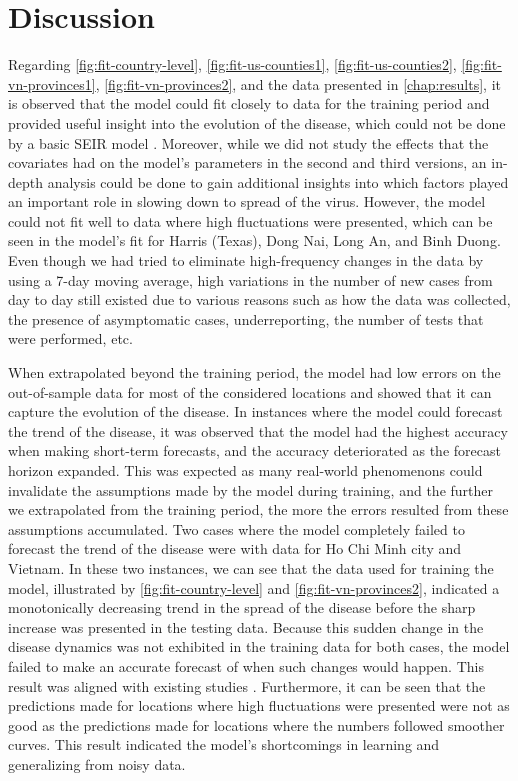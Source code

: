\chapter{Discussion}
\label{chap:discussion}

Regarding \autoref{fig:fit-country-level}, \autoref{fig:fit-us-counties1}, \autoref{fig:fit-us-counties2}, \autoref{fig:fit-vn-provinces1}, \autoref{fig:fit-vn-provinces2}, and the data presented in \autoref{chap:results}, it is observed that the model could fit closely to data for the training period and provided useful insight into the evolution of the disease, which could not be done by a basic \gls{SEIR} model \cite{dandekarMachineLearningAidedGlobal2020a}.
Moreover, while we did not study the effects that the covariates had on the model's parameters in the second and third versions, an in-depth analysis could be done to gain additional insights into which factors played an important role in slowing down to spread of the virus.
However, the model could not fit well to data where high fluctuations were presented, which can be seen in the model's fit for Harris (Texas), Dong Nai, Long An, and Binh Duong.
Even though we had tried to eliminate high-frequency changes in the data by using a 7-day moving average, high variations in the number of new cases from day to day still existed due to various reasons such as how the data was collected, the presence of asymptomatic cases, underreporting, the number of tests that were performed, etc.

When extrapolated beyond the training period, the model had low errors on the out-of-sample data for most of the considered locations and showed that it can capture the evolution of the disease.
In instances where the model could forecast the trend of the disease, it was observed that the model had the highest accuracy when making short-term forecasts, and the accuracy deteriorated as the forecast horizon expanded.
This was expected as many real-world phenomenons could invalidate the assumptions made by the model during training, and the further we extrapolated from the training period, the more the errors resulted from these assumptions accumulated.
Two cases where the model completely failed to forecast the trend of the disease were with data for Ho Chi Minh city and Vietnam.
In these two instances, we can see that the data used for training the model, illustrated by \autoref{fig:fit-country-level} and \autoref{fig:fit-vn-provinces2}, indicated a monotonically decreasing trend in the spread of the disease before the sharp increase was presented in the testing data.
Because this sudden change in the disease dynamics was not exhibited in the training data for both cases, the model failed to make an accurate forecast of when such changes would happen.
This result was aligned with existing studies \cite{arikInterpretableSequenceLearning}.
Furthermore, it can be seen that the predictions made for locations where high fluctuations were presented were not as good as the predictions made for locations where the numbers followed smoother curves.
This result indicated the model's shortcomings in learning and generalizing from noisy data.

